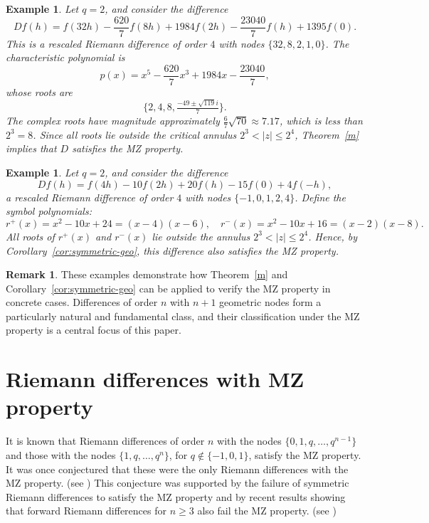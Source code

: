 \documentclass{raex}
\newtheorem{example}[theorem]{Example}
\theoremstyle{definition}
\newtheorem{remark}[theorem]{Remark}
\begin{document}
\begin{example}
Let \( q = 2 \), and consider the difference
\[
Df(h) = f(32h) - \frac{620}{7} f(8h) + 1984 f(2h) - \frac{23040}{7} f(h) + 1395 f(0).
\]
This is a rescaled Riemann difference of order \( 4 \) with nodes \( \{32, 8, 2, 1, 0\} \). The characteristic polynomial is
\[
p(x) = x^5 - \frac{620}{7} x^3 + 1984 x - \frac{23040}{7},
\]
whose roots are
\[
\{2, 4, 8, \tfrac{-49 \pm \sqrt{119}i}{7} \}.
\]
The complex roots have magnitude approximately \( \frac{6}{7} \sqrt{70} \approx 7.17 \), which is less than \( 2^3 = 8 \). Since all roots lie outside the critical annulus \( 2^3 < |z| \leq 2^4 \), Theorem~\ref{m} implies that \( D \) satisfies the MZ property.
\end{example}

\begin{example}
Let \( q = 2 \), and consider the difference
\[
Df(h) = f(4h) - 10 f(2h) + 20 f(h) - 15 f(0) + 4 f(-h),
\]
a rescaled Riemann difference of order \( 4 \) with nodes \( \{-1, 0, 1, 2, 4\} \). Define the symbol polynomials:
\[
r^+(x) = x^2 - 10x + 24 = (x - 4)(x - 6), \quad r^-(x) = x^2 - 10x + 16 = (x - 2)(x - 8).
\]
All roots of \( r^+(x) \) and \( r^-(x) \) lie outside the annulus \( 2^3 < |z| \leq 2^4 \). Hence, by Corollary~\ref{cor:symmetric-geo}, this difference also satisfies the MZ property.
\end{example}

\begin{remark}
These examples demonstrate how Theorem~\ref{m} and Corollary~\ref{cor:symmetric-geo} can be applied to verify the MZ property in concrete cases. Differences of order \( n \) with \( n+1 \) geometric nodes form a particularly natural and fundamental class, and their classification under the MZ property is a central focus of this paper.
\end{remark}

\section{Riemann differences with MZ property}

It is known that Riemann differences of order $n$ with the nodes $\{0, 1, q, \ldots, q^{n-1}\}$ and those with the nodes $\{1, q, \ldots, q^n\}$, for $q \notin \{-1, 0, 1\}$, satisfy the MZ property. It was once conjectured that these were the only Riemann differences with the MZ property. (see \cite{ACF1}) This conjecture was supported by the failure of symmetric Riemann differences to satisfy the MZ property and by recent results showing that forward Riemann differences for $n \geq 3$ also fail the MZ property. (see \cite{CF1})
\end{document}
